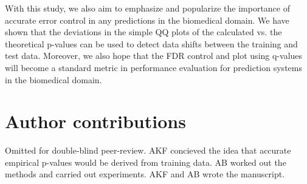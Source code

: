 \documentclass{article}
\newcommand{\todo}[2]{{\color{red} {\bf TODO-#1}: #2}}
\begin{document}
With this study, we also aim to emphasize and popularize the importance of accurate error control in any predictions in the biomedical domain. We have shown that the deviations in the simple QQ plots of the calculated vs. the theoretical p-values can be used to detect data shifts between the training and test data. Moreover, we also hope that the FDR control and plot using q-values will become a standard metric in performance evaluation for prediction systems in the biomedical domain.





\section*{Author contributions}
\ifdefined\DOUBLEBLINDREVIEW
Omitted for double-blind peer-review.
\else
AKF concieved the idea that accurate empirical p-values would be derived from training data. AB worked out the methods and carried out experiments. AKF and AB wrote the manuscript.
\fi


\end{document}
